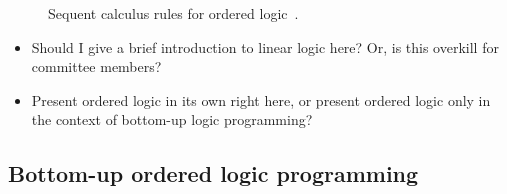 \begin{figure}
  \caption{Sequent calculus rules for ordered logic~\autocite{Polakow+Pfenning:MFPS99,Simmons:CMU12}.}
\end{figure}




\begin{itemize}
\item Should I give a brief introduction to linear logic here?  Or, is this overkill for committee members?
\item Present ordered logic in its own right here, or present ordered logic only in the context of bottom-up logic programming?
\end{itemize}

\subsection{Bottom-up ordered logic programming}\label{sec:ordered-lp}

